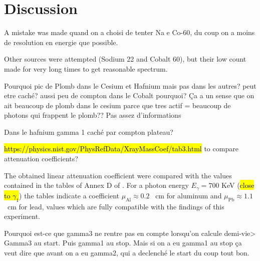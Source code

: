 \section{Discussion}
A mistake was made quand on a choisi de tenter Na e Co-60, du coup on a moins de resolution en energie que possible.

Other sources were attempted (Sodium 22 and Cobalt 60), 
but their low count made for very long times to get reasonable spectrum.

Pourquoi pic de Plomb dans le Cesium et Hafnium mais pas dans les autres?
peut etre caché? aussi peu de compton dans le Cobalt pourquoi?
Ça a un sense que on ait beaucoup de plomb dans le cesium parce que tres actif = beaucoup de photons qui frappent le plomb??
Pas assez d'informations

Dans le hafnium gamma 1 caché par compton plateau?


\hl{https://physics.nist.gov/PhysRefData/XrayMassCoef/tab3.html} to compare attenuation coefficients?

The obtained linear attenuation coefficient were compared 
with the values contained in the tables of Annex D of \cite{notice_generale}.
For a photon energy $E_{\gamma} = 700$ KeV (\hl{close to $\gamma_1$}) the tables indicate a coefficient 
$\mu_{\mathrm{Al}} \approx 0.2$ \unit{\per\cm} for aluminum and 
$\mu_{\mathrm{Pb}} \approx 1.1$ \unit{\per\cm} for lead,
values which are fully compatible with the findings of this experiment.

Pourquoi est-ce que gamma3 ne rentre pas en compte lorsqu'on calcule demi-vie>
Gamma3 au start. Puis gamma1 au stop. Mais si on a eu gamma1 au stop ça veut dire que avant on a eu gamma2, qui a declenché le start du coup tout bon.